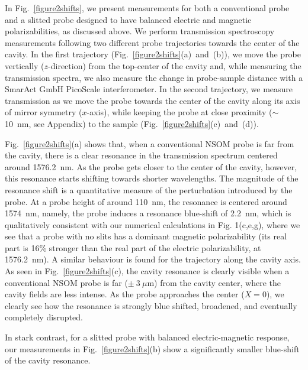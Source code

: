 \documentclass{osa-article}
\begin{document}
	In Fig.~\ref{figure2shifts}, we present measurements for both a conventional probe and a slitted probe designed to have balanced electric and magnetic polarizabilities, as discussed above. We perform transmission spectroscopy measurements following two different probe trajectories towards the center of the cavity. In the first trajectory (Fig.~\ref{figure2shifts}(a)~and~(b)), we move the probe vertically ($z$-direction) from the top-center of the cavity and, while measuring the transmission spectra, we also measure the change in probe-sample distance with a SmarAct GmbH PicoScale interferometer. In the second trajectory, we measure transmission as we move the probe towards the center of the cavity along its axis of mirror symmetry ($x$-axis), while keeping the probe at close proximity ($\sim$10~nm, see Appendix) to the sample (Fig.~\ref{figure2shifts}(c)~and~(d)).\par
	Fig.~\ref{figure2shifts}(a) shows that, when a conventional NSOM probe is far from the cavity, there is a clear resonance in the transmission spectrum centered around 1576.2~nm. As the probe gets closer to the center of the cavity, however, this resonance starts shifting towards shorter wavelengths. The magnitude of the resonance shift is a quantitative measure of the perturbation introduced by the probe. At a probe height of around 110~nm, the resonance is centered around 1574~nm, namely, the probe induces a resonance blue-shift of 2.2~nm, which is qualitatively consistent with our numerical calculations in Fig. 1(c,e,g), where we see that a probe with no slits has a dominant magnetic polarizability (its real part is 16\% stronger than the real part of the electric polarizability, at 1576.2~nm).
	A similar behaviour is found for the trajectory along the cavity axis. As seen in Fig.~\ref{figure2shifts}(c), the cavity resonance is clearly visible when a conventional NSOM probe is far ($\pm~3~\mu$m) from the cavity center, where the cavity fields are less intense. As the probe approaches the center ($X=0$), we clearly see how the resonance is strongly blue shifted, broadened, and eventually completely disrupted.\par
	In stark contrast, for a slitted probe with balanced electric-magnetic response, our measurements in Fig.~\ref{figure2shifts}(b) show a significantly smaller blue-shift of the cavity resonance.
\end{document}
